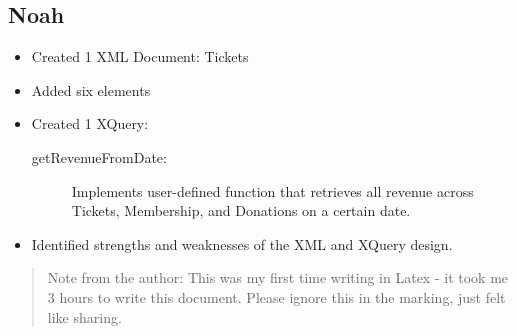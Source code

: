 \documentclass{article} %
\begin{document}
\subsection{Noah}
\begin{itemize}
    \item Created 1 XML Document: Tickets
    \item Added six elements 
    \item Created 1 XQuery: 
    \begin{description}
        \item[getRevenueFromDate:] Implements user-defined function that retrieves all revenue across Tickets, Membership, and Donations on a certain date.
    \end{description}
    \item Identified strengths and weaknesses of the XML and XQuery design.
\end{itemize}

\newpage
\begin{abstract}
    \item Note from the author: This was my first time writing in Latex - it 
    took me 3 hours to write this document. Please ignore this in the marking, just
    felt like sharing.
\end{abstract}
\end{document}
